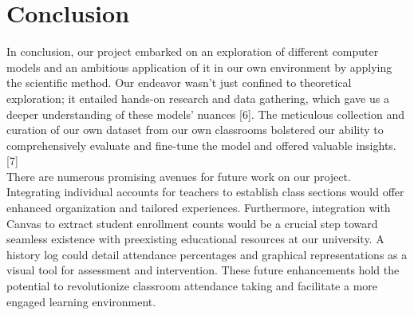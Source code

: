 \section{Conclusion}
\label{sec:conclusion}
In conclusion, our project embarked on an exploration of different computer models and an ambitious application of it in our own environment by applying the scientific method. Our endeavor wasn't just confined to theoretical exploration; it entailed hands-on research and data gathering, which gave us a deeper understanding of these models' nuances [6]. The meticulous collection and curation of our own dataset from our own classrooms bolstered our ability to comprehensively evaluate and fine-tune the model and offered valuable insights. [7]\\
There are numerous promising avenues for future work on our project. Integrating individual accounts for teachers to establish class sections would offer enhanced organization and tailored experiences. Furthermore, integration with Canvas to extract student enrollment counts would be a crucial step toward seamless existence with preexisting educational resources at our university. A history log could detail attendance percentages and graphical representations as a visual tool for assessment and intervention. These future enhancements hold the potential to revolutionize classroom attendance taking and facilitate a more engaged learning environment.
